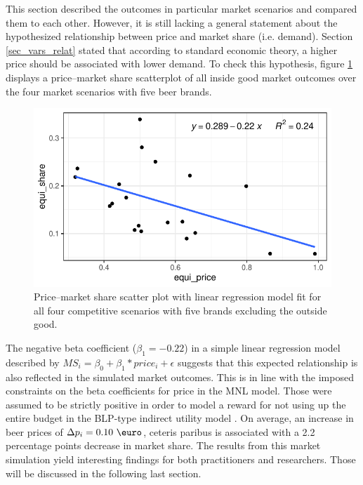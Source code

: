 \documentclass[12pt,a4paper]{article}
\begin{document}
This section described the outcomes in particular market scenarios and compared them to each other.
However, it is still lacking a general statement about the hypothesized relationship between price and market share (i.e. demand).
Section \ref{sec_vars_relat} stated that according to standard economic theory, a higher price should be associated with lower demand.
To check this hypothesis, figure \ref{fig_scatter_brand_comp} displays a price--market share scatterplot of all inside good market outcomes over the four market scenarios with five beer brands.

\begin{figure}[ht]
	\centering
  \includegraphics[scale = 0.8]{figures/scatter_price_share_all_five_scenarios.pdf}
	\caption{Price--market share scatter plot with linear regression model fit for all four competitive scenarios with five brands excluding the outside good.}
	\label{fig_scatter_brand_comp}
\end{figure}

The negative beta coefficient ($\beta_1 = -0.22$) in a simple linear regression model described by $MS_i = \beta_0 + \beta_1 * price_i + \epsilon$ suggests that this expected relationship is also reflected in the simulated market outcomes.
This is in line with the imposed constraints on the beta coefficients for price in the MNL model.
Those were assumed to be strictly positive in order to model a reward for not using up the entire budget in the BLP-type indirect utility model \citep{berryAutomobilePricesMarket1995}.
On average, an increase in beer prices of $\Delta p_i = 0.10 \text{ \euro}$, ceteris paribus is associated with a 2.2 percentage points decrease in market share. The results from this market simulation yield interesting findings for both practitioners and researchers.
Those will be discussed in the following last section.
\end{document}
